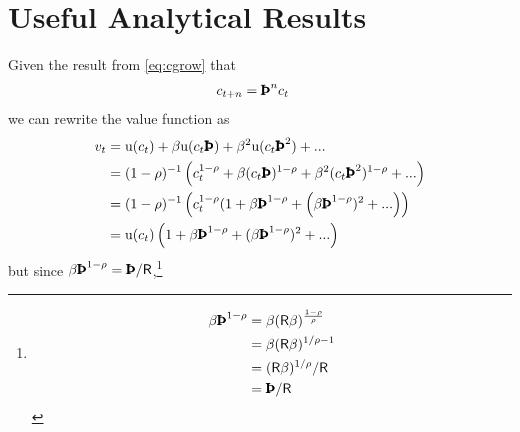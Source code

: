 \documentclass{scrartcl}
\begin{document}
\hypertarget{Useful-Analytical-Results}{}
\section{Useful Analytical Results}

Given the result from  \eqref{eq:cgrow} that
\begin{equation}\begin{gathered}\begin{aligned}
  c_{t+n} & =  \text{\pmb{\Thorn}}^{n} c_{t} \notag
\end{aligned}\end{gathered}\end{equation}
we can rewrite the value function as
\begin{equation}\begin{gathered}\begin{aligned}
  v_{t} & =  \mathrm{u}(c_{t}) + \beta \mathrm{u}(c_{t}\text{\pmb{\Thorn}}) + \beta^{2} \mathrm{u}(c_{t} \text{\pmb{\Thorn}}^{2}) + ...
  \\ & =  (1-\rho)^{-1}\left(c_{t}^{1-\rho} + \beta (c_{t}\text{\pmb{\Thorn}})^{1-\rho} + \beta^{2} (c_{t} \text{\pmb{\Thorn}}^{2})^{1-\rho} + ...\right)\notag 
  \\ & =  (1-\rho)^{-1}\left(c_{t}^{1-\rho}(1+\beta \text{\pmb{\Thorn}}^{1-\rho} + \left(\beta \text{\pmb{\Thorn}}^{1-\rho})^{2} + ... \right) \right)\notag 
\\ & =  \mathrm{u}(c_{t})\left(1+\beta \text{\pmb{\Thorn}}^{1-\rho} + (\beta \text{\pmb{\Thorn}}^{1-\rho})^{2} + ... \right)\notag 
\end{aligned}\end{gathered}\end{equation}
but since $\beta \text{\pmb{\Thorn}}^{1-\rho} = \text{\pmb{\Thorn}}/{\mathsf{R}}$,\footnote{
\begin{equation}\begin{gathered}\begin{aligned}
  \beta \text{\pmb{\Thorn}}^{1-\rho} & =  \beta (\mathsf{R} \beta)^{\frac{1-\rho}{\rho}}
  \\ & =                               \beta (\mathsf{R} \beta)^{1/\rho-1}
  \\ & =             (\mathsf{R} \beta)^{1/\rho} / \mathsf{R}
           \\ & =  \text{\pmb{\Thorn}}/{\mathsf{R}}
\end{aligned}\end{gathered}\end{equation}}
\end{document}
